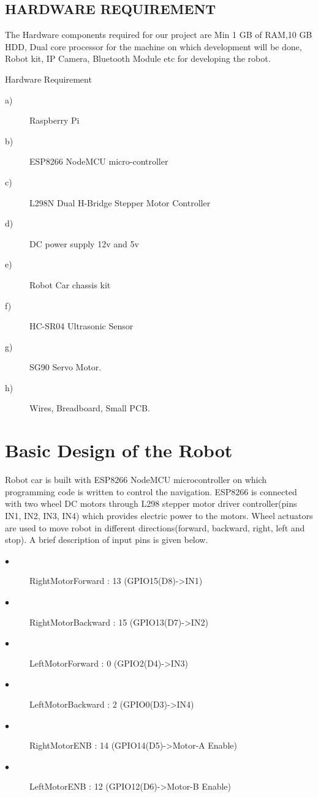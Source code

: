 \documentclass[sigconf]{acmart}
\begin{document}
\subsection{HARDWARE REQUIREMENT}
The Hardware components required for our project are Min 1 GB of RAM,10 GB HDD, Dual core processor for the machine on which development will be done, Robot kit, IP Camera, Bluetooth Module etc for developing the robot.

Hardware Requirement
\begin{description}
\item[a)] Raspberry Pi
\item[b)] ESP8266 NodeMCU micro-controller
\item[c)] L298N Dual H-Bridge Stepper Motor Controller
\item[d)] DC power supply 12v and 5v
\item[e)] Robot Car chassis kit
\item[f)] HC-SR04 Ultrasonic Sensor
\item[g)] SG90 Servo Motor.
\item[h)] Wires, Breadboard, Small PCB.
\end{description}

\section{Basic Design of the Robot}
Robot car is built with ESP8266 NodeMCU microcontroller on which programming code is written to control the navigation. ESP8266 is connected with two wheel DC motors through L298 stepper motor driver controller(pins IN1, IN2, IN3, IN4) which provides electric power to the motors. Wheel actuators are used to move robot in different directions(forward, backward, right, left and stop).
A brief description of input pins is given below.
\begin{description}
    \item[$\bullet$] RightMotorForward  : 13  (GPIO15(D8)->IN1)
    \item[$\bullet$] RightMotorBackward : 15 (GPIO13(D7)->IN2)
    \item[$\bullet$] LeftMotorForward   : 0    (GPIO2(D4)->IN3)
    \item[$\bullet$] LeftMotorBackward  : 2   (GPIO0(D3)->IN4)
    \item[$\bullet$] RightMotorENB      : 14 (GPIO14(D5)->Motor-A Enable)
    \item[$\bullet$] LeftMotorENB       : 12  (GPIO12(D6)->Motor-B Enable)
\end{description}
\end{document}
